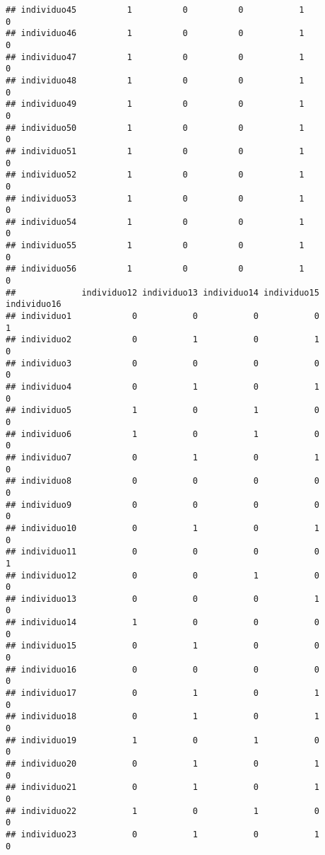 \documentclass[
]{article}
\begin{document}
\begin{verbatim}
## individuo45          1          0          0           1           0
## individuo46          1          0          0           1           0
## individuo47          1          0          0           1           0
## individuo48          1          0          0           1           0
## individuo49          1          0          0           1           0
## individuo50          1          0          0           1           0
## individuo51          1          0          0           1           0
## individuo52          1          0          0           1           0
## individuo53          1          0          0           1           0
## individuo54          1          0          0           1           0
## individuo55          1          0          0           1           0
## individuo56          1          0          0           1           0
##             individuo12 individuo13 individuo14 individuo15 individuo16
## individuo1            0           0           0           0           1
## individuo2            0           1           0           1           0
## individuo3            0           0           0           0           0
## individuo4            0           1           0           1           0
## individuo5            1           0           1           0           0
## individuo6            1           0           1           0           0
## individuo7            0           1           0           1           0
## individuo8            0           0           0           0           0
## individuo9            0           0           0           0           0
## individuo10           0           1           0           1           0
## individuo11           0           0           0           0           1
## individuo12           0           0           1           0           0
## individuo13           0           0           0           1           0
## individuo14           1           0           0           0           0
## individuo15           0           1           0           0           0
## individuo16           0           0           0           0           0
## individuo17           0           1           0           1           0
## individuo18           0           1           0           1           0
## individuo19           1           0           1           0           0
## individuo20           0           1           0           1           0
## individuo21           0           1           0           1           0
## individuo22           1           0           1           0           0
## individuo23           0           1           0           1           0

\end{verbatim}
\end{document}
